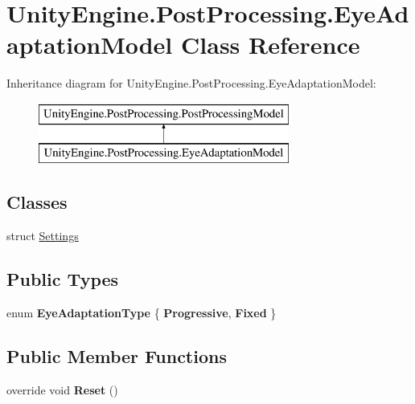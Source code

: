 \hypertarget{class_unity_engine_1_1_post_processing_1_1_eye_adaptation_model}{}\section{Unity\+Engine.\+Post\+Processing.\+Eye\+Adaptation\+Model Class Reference}
\label{class_unity_engine_1_1_post_processing_1_1_eye_adaptation_model}
Inheritance diagram for Unity\+Engine.\+Post\+Processing.\+Eye\+Adaptation\+Model\+:\begin{figure}[H]
\begin{center}
\leavevmode
\includegraphics[height=2.000000cm]{class_unity_engine_1_1_post_processing_1_1_eye_adaptation_model}
\end{center}
\end{figure}
\subsection*{Classes}
\begin{DoxyCompactItemize}
\item 
struct \mbox{\hyperlink{struct_unity_engine_1_1_post_processing_1_1_eye_adaptation_model_1_1_settings}{Settings}}
\end{DoxyCompactItemize}
\subsection*{Public Types}
\begin{DoxyCompactItemize}
\item 
\mbox{\label{class_unity_engine_1_1_post_processing_1_1_eye_adaptation_model_ab9307d267c9dc71faf8705f539a5d30b}} 
enum {\bfseries Eye\+Adaptation\+Type} \{ {\bfseries Progressive}, 
{\bfseries Fixed}
 \}
\end{DoxyCompactItemize}
\subsection*{Public Member Functions}
\begin{DoxyCompactItemize}
\item 
\mbox{\label{class_unity_engine_1_1_post_processing_1_1_eye_adaptation_model_a055eae23b68fd6d5b6ab1d98c306e814}} 
override void {\bfseries Reset} ()
\end{DoxyCompactItemize}
